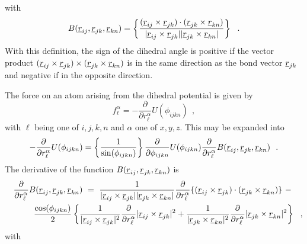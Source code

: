 with
\begin{equation}
B(\mbox{$\underline{r}$}_{ij},\mbox{$\underline{r}$}_{jk},\mbox{$\underline{r}$}_{kn})= \left\{\frac{
(\mbox{$\underline{r}$}_{ij}\times\mbox{$\underline{r}$}_{jk})\cdot(\mbox{$\underline{r}$}_{jk}\times\mbox{$\underline{r}$}_{kn})}
{|\mbox{$\underline{r}$}_{ij}\times\mbox{$\underline{r}$}_{jk}||\mbox{$\underline{r}$}_{jk}\times\mbox{$\underline{r}$}_{kn}|}
\right\}~~.
\end{equation}
With this definition, the sign of the
dihedral angle is positive if the vector
product \linebreak[4] \mbox{$(\mbox{$\underline{r}$}_{ij} \times \mbox{$\underline{r}$}_{jk})
\times (\mbox{$\underline{r}$}_{jk} \times \mbox{$\underline{r}$}_{kn})$} is in the same
direction as the bond vector $\mbox{$\underline{r}$}_{jk}$
and negative if in the opposite direction.

The force on an atom arising from the dihedral potential is given by
\begin{equation}
f_{\ell}^{\alpha}=-\frac{\partial}{\partial
r_{\ell}^{\alpha}}U(\phi_{ijkn})~~,
\end{equation}
with $\ell$ being one of $i,j,k,n$ and $\alpha$ one of $x,y,z$.
This may be expanded into
\begin{equation}
-\frac{\partial}{\partial r_{\ell}^{\alpha}}U(\phi_{ijkn})=
\left\{\frac{1}{\sin(\phi_{ijkn})}\right\}
\frac{\partial}{\partial \phi_{ijkn}}U(\phi_{ijkn})
\frac{\partial}{\partial r_{\ell}^{\alpha}}
B(\mbox{$\underline{r}$}_{ij},\mbox{$\underline{r}$}_{jk},\mbox{$\underline{r}$}_{kn})~~.
\end{equation}
The derivative of the function
$B(\mbox{$\underline{r}$}_{ij},\mbox{$\underline{r}$}_{jk},\mbox{$\underline{r}$}_{kn})$ is
\begin{eqnarray}
& &\frac{\partial}{\partial r_{\ell}^{\alpha}}
B(\mbox{$\underline{r}$}_{ij},\mbox{$\underline{r}$}_{jk},\mbox{$\underline{r}$}_{kn})~=~
\frac{1}{|\mbox{$\underline{r}$}_{ij}\times\mbox{$\underline{r}$}_{jk}||\mbox{$\underline{r}$}_{jk}\times\mbox{$\underline{r}$}_{kn}|}
\frac{\partial}{\partial r_{\ell}^{\alpha}}
\{(\mbox{$\underline{r}$}_{ij}\times\mbox{$\underline{r}$}_{jk})\cdot(\mbox{$\underline{r}$}_{jk}\times\mbox{$\underline{r}$}_{kn})\}~-~~~~\nonumber \\
& & \phantom{x} \frac{\cos(\phi_{ijkn})}{2}\left\{
\frac{1}{|\mbox{$\underline{r}$}_{ij}\times\mbox{$\underline{r}$}_{jk}|^{2}}
\frac{\partial}{\partial r_{\ell}^{\alpha}}
|\mbox{$\underline{r}$}_{ij}\times\mbox{$\underline{r}$}_{jk}|^{2}+
\frac{1}{|\mbox{$\underline{r}$}_{jk}\times\mbox{$\underline{r}$}_{kn}|^{2}}
\frac{\partial}{\partial r_{\ell}^{\alpha}}
|\mbox{$\underline{r}$}_{jk}\times\mbox{$\underline{r}$}_{kn}|^{2} \right\}~~,
\end{eqnarray}
with

